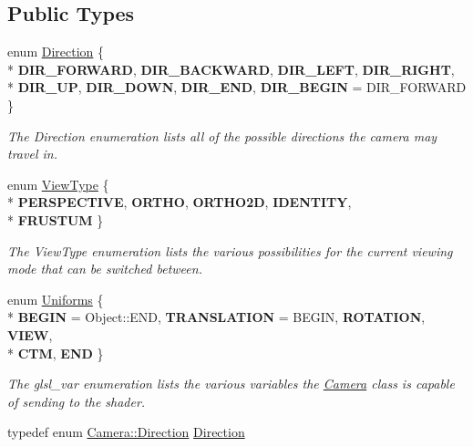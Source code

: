 \subsection*{Public Types}
\begin{DoxyCompactItemize}
\item 
enum \hyperlink{class_camera_a80cb65605322d27ad3b6d973484509ec}{Direction} \{ \\*
{\bfseries D\-I\-R\-\_\-\-F\-O\-R\-W\-A\-R\-D}, 
{\bfseries D\-I\-R\-\_\-\-B\-A\-C\-K\-W\-A\-R\-D}, 
{\bfseries D\-I\-R\-\_\-\-L\-E\-F\-T}, 
{\bfseries D\-I\-R\-\_\-\-R\-I\-G\-H\-T}, 
\\*
{\bfseries D\-I\-R\-\_\-\-U\-P}, 
{\bfseries D\-I\-R\-\_\-\-D\-O\-W\-N}, 
{\bfseries D\-I\-R\-\_\-\-E\-N\-D}, 
{\bfseries D\-I\-R\-\_\-\-B\-E\-G\-I\-N} = D\-I\-R\-\_\-\-F\-O\-R\-W\-A\-R\-D
 \}
\begin{DoxyCompactList}\small\item\em The Direction enumeration lists all of the possible directions the camera may travel in. \end{DoxyCompactList}\item 
enum \hyperlink{class_camera_aaa256acd50a2fa143d9f8d9456e2802f}{View\-Type} \{ \\*
{\bfseries P\-E\-R\-S\-P\-E\-C\-T\-I\-V\-E}, 
{\bfseries O\-R\-T\-H\-O}, 
{\bfseries O\-R\-T\-H\-O2\-D}, 
{\bfseries I\-D\-E\-N\-T\-I\-T\-Y}, 
\\*
{\bfseries F\-R\-U\-S\-T\-U\-M}
 \}
\begin{DoxyCompactList}\small\item\em The View\-Type enumeration lists the various possibilities for the current viewing mode that can be switched between. \end{DoxyCompactList}\item 
enum \hyperlink{class_camera_a630738fd23098d44c0d15ee28d5649dd}{Uniforms} \{ \\*
{\bfseries B\-E\-G\-I\-N} = Object\-:\-:E\-N\-D, 
{\bfseries T\-R\-A\-N\-S\-L\-A\-T\-I\-O\-N} = B\-E\-G\-I\-N, 
{\bfseries R\-O\-T\-A\-T\-I\-O\-N}, 
{\bfseries V\-I\-E\-W}, 
\\*
{\bfseries C\-T\-M}, 
{\bfseries E\-N\-D}
 \}
\begin{DoxyCompactList}\small\item\em The glsl\-\_\-var enumeration lists the various variables the \hyperlink{class_camera}{Camera} class is capable of sending to the shader. \end{DoxyCompactList}\item 
typedef enum \hyperlink{class_camera_a80cb65605322d27ad3b6d973484509ec}{Camera\-::\-Direction} \hyperlink{class_camera_a94bb7ceb1c7a05e54cf638924f228baf}{Direction}

\end{DoxyCompactItemize}
